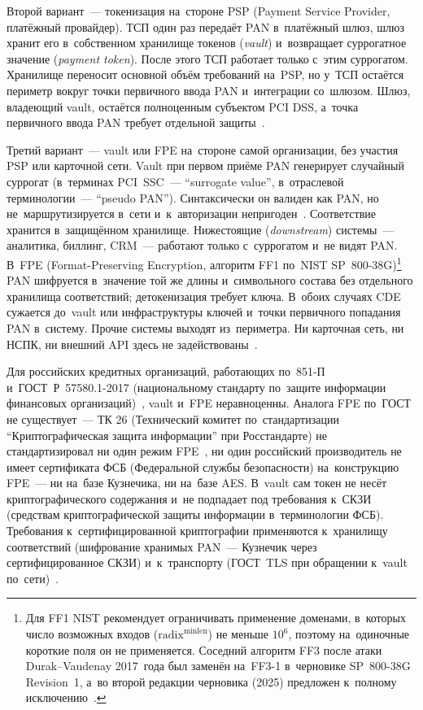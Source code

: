 Второй вариант~--- токенизация на~стороне PSP (Payment Service Provider,
платёжный провайдер). ТСП один раз передаёт PAN в~платёжный шлюз, шлюз хранит
его в~собственном хранилище токенов (\textit{vault}) и~возвращает суррогатное
значение (\textit{payment token}). После этого ТСП работает только с~этим
суррогатом. Хранилище переносит основной
объём требований на~PSP, но у~ТСП остаётся периметр вокруг точки первичного ввода PAN
и~интеграции со~шлюзом. Шлюз, владеющий vault, остаётся полноценным
субъектом PCI DSS, а~точка первичного ввода PAN требует отдельной
защиты~\cite{pci-dss-4}.

Третий вариант~--- vault или FPE на~стороне самой организации, без участия PSP
или карточной сети. Vault при первом приёме PAN генерирует случайный суррогат
(в~терминах PCI~SSC~--- \enquote{surrogate value}, в~отраслевой терминологии~---
\enquote{pseudo PAN}). Синтаксически он валиден как PAN, но
не~маршрутизируется в~сети и~к~авторизации
непригоден~\cite{pci-tokenization-guidelines}. Соответствие хранится
в~защищённом хранилище. Нижестоящие (\textit{downstream}) системы~--- аналитика,
биллинг, CRM~--- работают только с~суррогатом и~не видят PAN. В~FPE
(Format-Preserving Encryption, алгоритм FF1 по~NIST SP~800-38G)\footnote{Для
  FF1 NIST рекомендует ограничивать применение доменами, в~которых число
  возможных входов ($\mathrm{radix}^{\mathrm{minlen}}$) не меньше $10^6$, поэтому
  на~одиночные короткие поля он не применяется. Соседний алгоритм FF3 после атаки
  Durak--Vaudenay 2017~года был заменён на~FF3-1 в~черновике SP~800-38G
  Revision~1, а~во второй редакции черновика (2025) предложен к~полному
исключению~\cite{nist-sp-800-38g-r1}.} PAN шифруется в~значение той же длины и~символьного состава без
отдельного хранилища соответствий; детокенизация требует ключа. В~обоих случаях
CDE сужается до~vault или инфраструктуры ключей и~точки первичного попадания
PAN в~систему. Прочие системы выходят из~периметра. Ни карточная сеть, ни НСПК,
ни внешний API здесь не
задействованы~\cite{pci-dss-4,pci-tokenization-guidelines,nist-sp-800-38g}.

Для российских кредитных организаций, работающих по~851-П
и~ГОСТ~Р~57580.1-2017 (национальному стандарту по~защите
информации финансовых организаций)~\cite{cbr-851p,gost-57580-1}, vault
и~FPE неравноценны. Аналога FPE по~ГОСТ не существует~--- ТК 26
(Технический комитет
  по~стандартизации \enquote{Криптографическая защита информации} при
Росстандарте) не стандартизировал ни один режим
FPE~\cite{gost-34-13,tc26-recommendations}, ни один российский производитель не
имеет сертификата ФСБ (Федеральной службы безопасности) на~конструкцию FPE~---
ни на~базе Кузнечика, ни на~базе AES. В~vault сам токен не несёт
криптографического содержания и~не подпадает под требования к~СКЗИ (средствам
криптографической защиты информации в~терминологии ФСБ). Требования
к~сертифицированной криптографии применяются к~хранилищу соответствий
(шифрование хранимых PAN~--- Кузнечик через сертифицированное СКЗИ)
и~к~транспорту (ГОСТ~TLS при обращении к~vault по~сети)~\cite{cbr-851p}.

